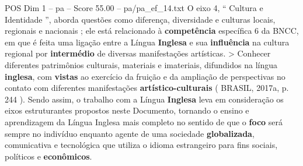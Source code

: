 \begin{textsample}{POS Dim 1 – pa – Score 55.00 – pa/pa\_ef\_14.txt}
O eixo 4, “ Cultura e Identidade ”, aborda questões como diferença, diversidade e culturas locais, regionais e nacionais ; ele está relacionado à \textbf{competência} específica 6 da BNCC, em que é feita uma ligação entre a Língua \textbf{Inglesa} e sua \textbf{influência} na cultura regional por \textbf{intermédio} de diversas manifestações artísticas. > Conhecer diferentes patrimônios culturais, materiais e imateriais, difundidos na língua \textbf{inglesa}, com \textbf{vistas} ao exercício da fruição e da ampliação de perspectivas no contato com diferentes manifestações \textbf{artístico-culturais} ( BRASIL, 2017a, p. 244 ).
Sendo assim, o trabalho com a Língua \textbf{Inglesa} leva em consideração os eixos estruturantes propostos neste Documento, tornando o ensino e aprendizagem da Língua Inglesa mais completo no sentido de que o \textbf{foco} será sempre no indivíduo enquanto agente de uma sociedade \textbf{globalizada}, comunicativa e tecnológica que utiliza o idioma estrangeiro para fins sociais, políticos e \textbf{econômicos}.

\end{textsample}
